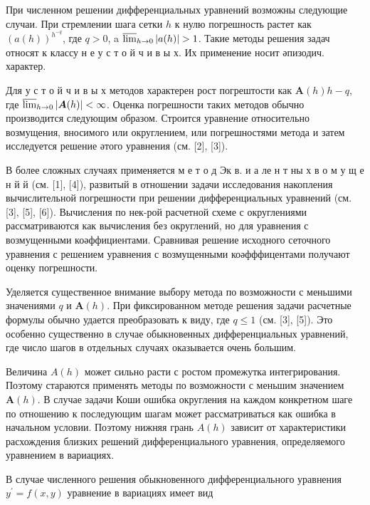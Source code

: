 \documentclass[10pt]{article}
\begin{document}
При численном решении дифференциальных уравнений возможны следующие случаи. При стремлении шага сетки $h$ к нулю погрешность растет как $(a(h))^{h^{-q}}$, где $q>0$, a $\varlimsup_{h \rightarrow 0}|a(h)|>1$. Такие методы решения задач относят к классу н е у с т о й ч и в ы х. Их применение носит әпизодич. характер.



Для у с т о й ч и в ы х методов характерен рост погрештости как $\boldsymbol{A}(h) h-q$, где $\varlimsup_{h \rightarrow 0}|\boldsymbol{A}(h)|<\infty$. Оценка погрешности таких методов обычно производится следующим образом. Строится уравнение относительно возмущения, вносимого или округлением, или погрешностями метода и затем исследуется решение әтого уравнения (см. [2], [3]).



В более сложных случаях применяется м е т о д Эк в. и а ле н т ны х в о м у щ е н й й (см. [1], [4]), развитый в отношении задачи исследования накопления вычислительной погрешности при решении дифференциальных уравнений (см. [3], [5], [6]). Вычисления по нек-рой расчетной схеме с округлениями рассматриваются как вычисления без округлений, но для уравнения с возмущенными коәффициентами. Сравнивая решение исходного сеточного уравнения с решением уравнения с возмущенными коәфффицентами получают оценку погрешности.



Уделяется существенное внимание выбору метода по возможности с меньшими значениями $q$ и $\boldsymbol{A}(h)$. При фиксированном методе решения задачи расчетные формулы обычно удается преобразовать к виду, где $q \leqslant 1$ (см. [3], [5]). Это особенно существенно в случае обыкновенных дифференциальных уравнений, где число шагов в отдельных случаях оказывается очень большим.



Величина $A(h)$ может сильно расти с ростом промежутка интегрирования. Поэтому стараются применять методы по возможности с меньшим значением $\boldsymbol{A}(h)$. В случае задачи Коши ошибка округления на каждом конкретном шаге по отношению к последующим шагам может рассматриваться как ошибка в начальном условии. Поэтому нижняя грань $A(h)$ зависит от характеристики расхождения близких решений дифференциального уравнения, определяемого уравнением в вариациях.



В случае численного решения обыкновенного дифференциального уравнения $y^{\prime}=f(x, y)$ уравнение в вариациях имеет вид
\end{document}
